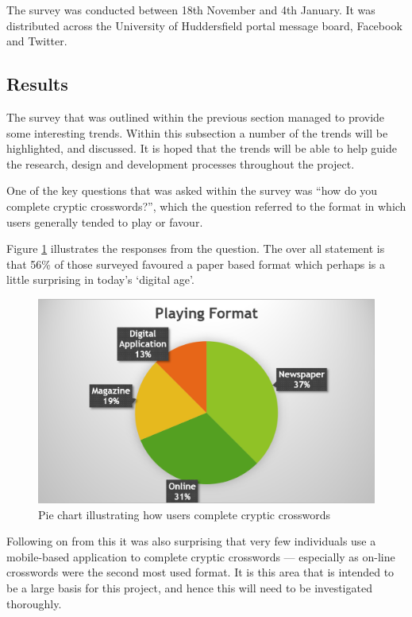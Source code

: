 The survey was conducted between 18th November and 4th January. It was 
distributed across the University of Huddersfield portal message board,
Facebook and Twitter.


\subsection{Results}

The survey that was outlined within the previous section managed to provide some
interesting trends. Within this subsection a number of the trends will be 
highlighted, and discussed. It is hoped that the trends will be able to help 
guide the research, design and development processes throughout the project.

One of the key questions that was asked within the survey was ``how do you 
complete cryptic crosswords?'', which the question referred to the format in 
which users generally tended to play or favour. 

Figure \ref{fig:playing_format} illustrates the responses from the question. The
over all statement is that 56\% of those surveyed favoured a paper based format
which perhaps is a little surprising in today's `digital age'.

\begin{figure}[H]
  \centering
  \includegraphics[scale=0.9]{graphs/playing_format.png}
  \caption{Pie chart illustrating how users complete cryptic crosswords}
  \label{fig:playing_format}
\end{figure}

Following on from this it was also surprising that very few individuals use a 
mobile-based application to complete cryptic crosswords --- especially as 
on-line crosswords were the second most used format. It is this area that is
intended to be a large basis for this project, and hence this will need to be
investigated thoroughly.


